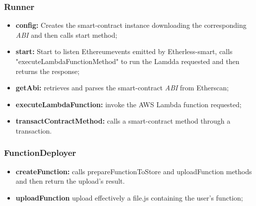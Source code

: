 \subsubsection{Runner}
\begin{itemize}
	\item \textbf{config:} Creates the smart-contract instance downloading the corresponding \textit{ABI\glo} and then calls start method;
	\item \textbf{start:} Start to listen Ethereum\glo events emitted by Etherless-smart, calls "executeLambdaFunctionMethod" to run the Lamdda requested and then returns the response;
	\item \textbf{getAbi:} retrieves and parses the smart-contract \textit{ABI\glo} from Etherscan;
	\item \textbf{executeLambdaFunction:} invoke the AWS Lambda function requested;
	\item \textbf{transactContractMethod:} calls a smart-contract method through a transaction.
\end{itemize}
\subsubsection{FunctionDeployer}
\begin{itemize}
	\item \textbf{createFunction:} calls prepareFunctionToStore and uploadFunction methods and then return the upload's result.
	\item \textbf{uploadFunction} upload effectively a file.js containing the user's function;
	
\end{itemize}
